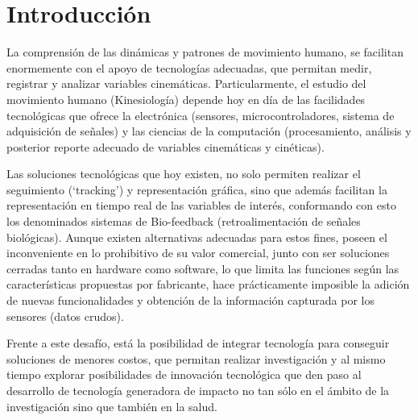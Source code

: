 \documentclass[12pt,a4paper]{article}
\begin{document}
\thispagestyle{empty}
\tableofcontents %
\thispagestyle{empty}
\listoffigures
\thispagestyle{empty}
\listoftables

\thispagestyle{empty}
\pagebreak
\setcounter{page}{1}

\let\stdsection\section
\renewcommand\section{\newpage\stdsection}



\section{Introducción}
La comprensión de las dinámicas y patrones de movimiento humano, se facilitan enormemente con el apoyo de tecnologías adecuadas, que permitan medir, registrar y analizar variables cinemáticas. Particularmente, el estudio del movimiento humano (Kinesiología) depende hoy en día de las facilidades tecnológicas que ofrece la electrónica (sensores, microcontroladores, sistema de adquisición de señales) y las ciencias de la computación (procesamiento, análisis y posterior reporte adecuado de  variables cinemáticas y cinéticas).  

Las soluciones tecnológicas que hoy existen, no solo permiten realizar el seguimiento (‘tracking’) y representación gráfica, sino que además facilitan la representación en tiempo real de las variables de interés, conformando con esto los denominados sistemas de Bio-feedback (retroalimentación de señales biológicas). Aunque existen alternativas adecuadas para estos fines, poseen el inconveniente en lo prohibitivo de su valor comercial, junto con ser soluciones cerradas tanto en hardware como software, lo que limita las funciones según las características propuestas por fabricante, hace prácticamente imposible la adición de nuevas funcionalidades y obtención de la información capturada por los sensores (datos crudos).

Frente a este desafío, está la posibilidad de integrar tecnología para conseguir soluciones de menores costos, que permitan realizar investigación y al mismo tiempo explorar posibilidades de innovación tecnológica que den paso al desarrollo de tecnología generadora de impacto no tan sólo en el ámbito de la investigación sino que también en la salud.
\end{document}
